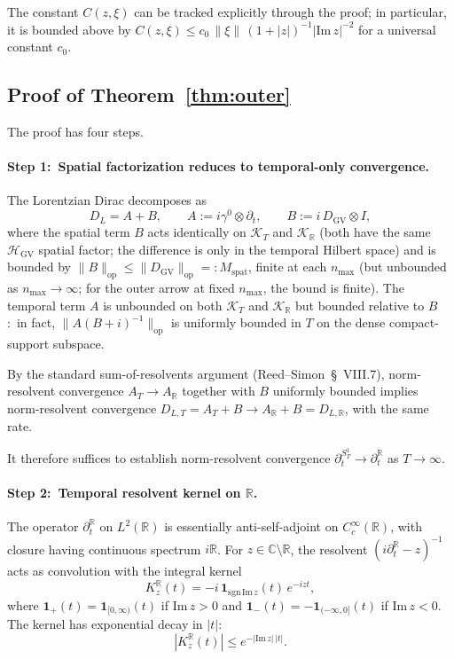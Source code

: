 \documentclass[11pt,a4paper]{article}
\theoremstyle{plain}
\theoremstyle{definition}
\newcommand{\nmax}{n_{\max}}
\newcommand{\Sone}{S^{1}}
\newcommand{\Krein}{\mathcal{K}}
\newcommand{\opnorm}[1]{\lVert #1 \rVert_{\mathrm{op}}}
\newcommand{\norm}[1]{\lVert #1 \rVert}
\newcommand{\R}{\mathbb{R}}
\newcommand{\C}{\mathbb{C}}
\newcommand{\DGV}{D_{\mathrm{GV}}}
\newcommand{\DL}{D_{L}}
\newcommand{\DLR}{D_{L,\R}}
\newcommand{\DLT}{D_{L,T}}
\newcommand{\HGV}{\mathcal{H}_{\mathrm{GV}}}
\newcommand{\spat}{\mathrm{spat}}
\begin{document}
The constant $C(z, \xi)$ can be tracked explicitly through the proof;
in particular, it is bounded above by
$C(z, \xi) \le c_{0}\,\norm{\xi}\,(1 + |z|)^{-1}|\mathrm{Im}\,z|^{-2}$
for a universal constant $c_{0}$.

\subsection{Proof of Theorem~\ref{thm:outer}}\label{sec:outer_proof}

The proof has four steps.

\paragraph*{Step 1:\ Spatial factorization reduces to temporal-only
convergence.}
The Lorentzian Dirac decomposes as
\[
\DL = A + B, \qquad A := i\gamma^{0}\otimes\partial_{t},
\qquad B := i\,\DGV\otimes I,
\]
where the spatial term $B$ acts identically on $\Krein_{T}$ and
$\Krein_{\R}$ (both have the same $\HGV$ spatial factor; the difference
is only in the temporal Hilbert space) and is bounded by
$\opnorm{B} \le \opnorm{\DGV} =: M_{\spat}$, finite at each $\nmax$
(but unbounded as $\nmax \to \infty$; for the outer arrow at fixed
$\nmax$, the bound is finite). The temporal term $A$ is unbounded on
both $\Krein_{T}$ and $\Krein_{\R}$ but bounded relative to
$B$:\ in fact, $\opnorm{A(B + i)^{-1}}$ is uniformly bounded in $T$ on
the dense compact-support subspace.

By the standard sum-of-resolvents argument
(Reed--Simon~\S~VIII.7), norm-resolvent convergence
$A_{T} \to A_{\R}$ together with $B$ uniformly bounded implies
norm-resolvent convergence $\DLT = A_{T} + B \to A_{\R} + B = \DLR$,
with the same rate.

It therefore suffices to establish norm-resolvent convergence
$\partial_{t}^{\Sone_{T}} \to \partial_{t}^{\R}$ as $T \to \infty$.

\paragraph*{Step 2:\ Temporal resolvent kernel on $\R$.}
The operator $\partial_{t}^{\R}$ on $L^{2}(\R)$ is essentially
anti-self-adjoint on $C_{c}^{\infty}(\R)$, with closure having
continuous spectrum $i\R$. For $z \in \C\setminus\R$, the resolvent
$(i\partial_{t}^{\R} - z)^{-1}$ acts as convolution with the integral
kernel
\begin{equation}\label{eq:R_kernel}
K_{z}^{\R}(t) = -i\,\mathbf{1}_{\mathrm{sgn}\,\mathrm{Im}\,z}(t)\,
e^{-i z t},
\end{equation}
where $\mathbf{1}_{+}(t) = \mathbf{1}_{[0,\infty)}(t)$ if $\mathrm{Im}\,z
> 0$ and $\mathbf{1}_{-}(t) = -\mathbf{1}_{(-\infty,0]}(t)$ if
$\mathrm{Im}\,z < 0$. The kernel has exponential decay in $|t|$:
\[
|K_{z}^{\R}(t)| \le e^{-|\mathrm{Im}\,z|\,|t|}.
\]
\end{document}
